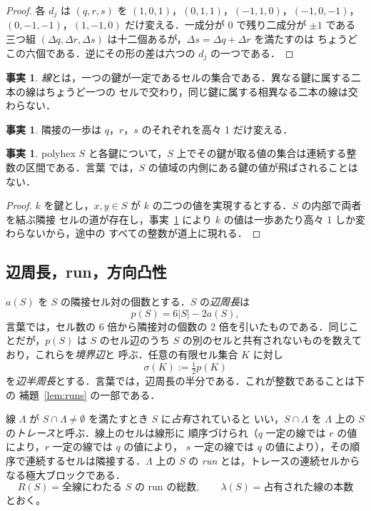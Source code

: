 \documentclass[11pt]{article}
\theoremstyle{plain}
\theoremstyle{definition}
\newtheorem{fact}[theorem]{事実}
\theoremstyle{remark}
\begin{document}
\begin{proof}
各 \(d_{j}\) は \((q,r,s)\) を \((1,0,1)\)，\((0,1,1)\)，\((-1,1,0)\)，\((-1,0,-1)\)，
\((0,-1,-1)\)，\((1,-1,0)\) だけ変える．一成分が 0 で残り二成分が \(\pm1\) である三つ組
\((\Delta q,\Delta r,\Delta s)\) は十二個あるが，\(\Delta s=\Delta q+\Delta r\) を満たすのは
ちょうどこの六個である．逆にその形の差は六つの \(d_{j}\) の一つである．
\end{proof}

\begin{fact}\label{f:2}
\emph{線}とは，一つの鍵が一定であるセルの集合である．異なる鍵に属する二本の線はちょうど一つの
セルで交わり，同じ鍵に属する相異なる二本の線は交わらない．
\end{fact}

\begin{fact}\label{f:3}
隣接の一歩は \(q\)，\(r\)，\(s\) のそれぞれを高々 1 だけ変える．
\end{fact}

\begin{fact}\label{f:4}
polyhex \(S\) と各鍵について，\(S\) 上でその鍵が取る値の集合は連続する整数の区間である．言葉
では，\(S\) の値域の内側にある鍵の値が飛ばされることはない．
\end{fact}

\begin{proof}
\(k\) を鍵とし，\(x,y\in S\) が \(k\) の二つの値を実現するとする．\(S\) の内部で両者を結ぶ隣接
セルの道が存在し，事実~\ref{f:3} により \(k\) の値は一歩あたり高々 1 しか変わらないから，途中の
すべての整数が道上に現れる．
\end{proof}

\subsection{辺周長，run，方向凸性}\label{sec:2.2}

\(a(S)\) を \(S\) の隣接セル対の個数とする．\(S\) の\emph{辺周長}は
\begin{equation}\label{eq:p}
   p(S)=6|S|-2a(S),
\end{equation}
言葉では，セル数の 6 倍から隣接対の個数の 2 倍を引いたものである．同じことだが，\(p(S)\) は
\(S\) のセル辺のうち \(S\) の別のセルと共有されないものを数えており，これらを\emph{境界辺}と
呼ぶ．任意の有限セル集合 \(K\) に対し
\[
   \sigma(K):=\tfrac{1}{2}p(K)
\]
を\emph{辺半周長}とする．言葉では，辺周長の半分である．これが整数であることは下の
補題~\ref{lem:runs} の一部である．

線 \(\Lambda\) が \(S\cap\Lambda\neq\emptyset\) を満たすとき \(S\) に\emph{占有}されていると
いい，\(S\cap\Lambda\) を \(\Lambda\) 上の \(S\) の\emph{トレース}と呼ぶ．線上のセルは線形に
順序づけられ（\(q\) 一定の線では \(r\) の値により，\(r\) 一定の線では \(q\) の値により，
\(s\) 一定の線では \(q\) の値により），その順序で連続するセルは隣接する．\(\Lambda\) 上の
\(S\) の \emph{run} とは，トレースの連続セルからなる極大ブロックである．
\[
   R(S)=\text{全線にわたる \(S\) の run の総数},\qquad
   \lambda(S)=\text{占有された線の本数}
\]
とおく。
\end{document}
